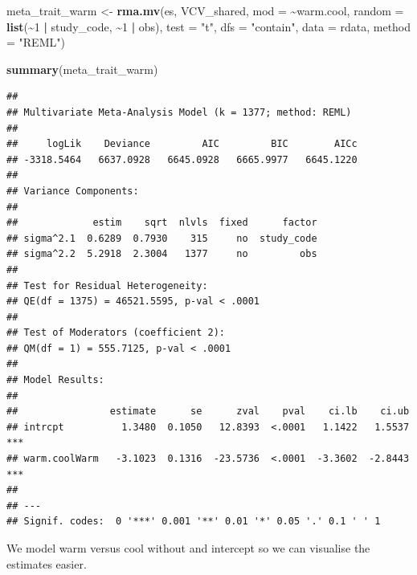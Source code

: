\documentclass[
]{article}
\newenvironment{Shaded}{\begin{snugshade}}{\end{snugshade}}
\newcommand{\AttributeTok}[1]{\textcolor[rgb]{0.13,0.29,0.53}{#1}}
\newcommand{\DecValTok}[1]{\textcolor[rgb]{0.00,0.00,0.81}{#1}}
\newcommand{\FunctionTok}[1]{\textcolor[rgb]{0.13,0.29,0.53}{\textbf{#1}}}
\newcommand{\NormalTok}[1]{#1}
\newcommand{\OtherTok}[1]{\textcolor[rgb]{0.56,0.35,0.01}{#1}}
\newcommand{\SpecialCharTok}[1]{\textcolor[rgb]{0.81,0.36,0.00}{\textbf{#1}}}
\newcommand{\StringTok}[1]{\textcolor[rgb]{0.31,0.60,0.02}{#1}}
\begin{document}
\begin{Shaded}
\begin{Highlighting}[]
\NormalTok{meta\_trait\_warm }\OtherTok{\textless{}{-}} \FunctionTok{rma.mv}\NormalTok{(es, VCV\_shared, }\AttributeTok{mod =} \SpecialCharTok{\textasciitilde{}}\NormalTok{warm.cool, }\AttributeTok{random =} \FunctionTok{list}\NormalTok{(}\SpecialCharTok{\textasciitilde{}}\DecValTok{1} \SpecialCharTok{|}
\NormalTok{    study\_code, }\SpecialCharTok{\textasciitilde{}}\DecValTok{1} \SpecialCharTok{|}\NormalTok{ obs), }\AttributeTok{test =} \StringTok{"t"}\NormalTok{, }\AttributeTok{dfs =} \StringTok{"contain"}\NormalTok{, }\AttributeTok{data =}\NormalTok{ rdata,}
    \AttributeTok{method =} \StringTok{"REML"}\NormalTok{)}
\end{Highlighting}
\end{Shaded}

\begin{Shaded}
\begin{Highlighting}[]
\FunctionTok{summary}\NormalTok{(meta\_trait\_warm)}
\end{Highlighting}
\end{Shaded}

\begin{verbatim}
## 
## Multivariate Meta-Analysis Model (k = 1377; method: REML)
## 
##     logLik    Deviance         AIC         BIC        AICc   
## -3318.5464   6637.0928   6645.0928   6665.9977   6645.1220   
## 
## Variance Components:
## 
##             estim    sqrt  nlvls  fixed      factor 
## sigma^2.1  0.6289  0.7930    315     no  study_code 
## sigma^2.2  5.2918  2.3004   1377     no         obs 
## 
## Test for Residual Heterogeneity:
## QE(df = 1375) = 46521.5595, p-val < .0001
## 
## Test of Moderators (coefficient 2):
## QM(df = 1) = 555.7125, p-val < .0001
## 
## Model Results:
## 
##                estimate      se      zval    pval    ci.lb    ci.ub      
## intrcpt          1.3480  0.1050   12.8393  <.0001   1.1422   1.5537  *** 
## warm.coolWarm   -3.1023  0.1316  -23.5736  <.0001  -3.3602  -2.8443  *** 
## 
## ---
## Signif. codes:  0 '***' 0.001 '**' 0.01 '*' 0.05 '.' 0.1 ' ' 1
\end{verbatim}

\newpage

We model warm versus cool without and intercept so we can visualise the
estimates easier.
\end{document}
